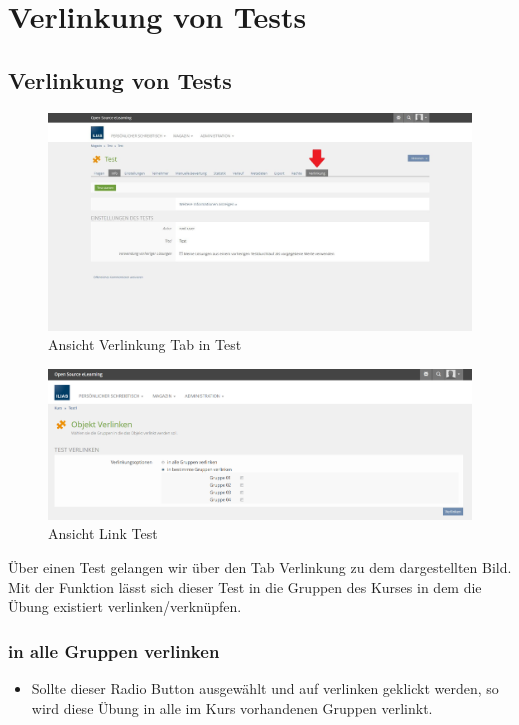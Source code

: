 \chapter{Verlinkung von Tests}\label{linkTest}
\minitoc
\clearpage

\section{Verlinkung von Tests}
\begin{figure}
	\centering
	\includegraphics[width=1\textwidth]{img/Test.jpg}
	\caption{Ansicht Verlinkung Tab in Test}
\end{figure}

\begin{figure}
	\centering
	\includegraphics[width=1\textwidth]{img/linkTest.png}
	\caption{Ansicht Link Test}
\end{figure}

Über einen Test gelangen wir über den Tab Verlinkung zu dem dargestellten Bild. 
Mit der Funktion lässt sich dieser Test in die Gruppen des Kurses in dem die Übung existiert verlinken/verknüpfen. 

\subsection*{in alle Gruppen verlinken}
\begin{itemize}
	\item Sollte dieser Radio Button ausgewählt und auf verlinken geklickt werden, so wird diese Übung in alle im Kurs vorhandenen Gruppen verlinkt. 
\end{itemize}

